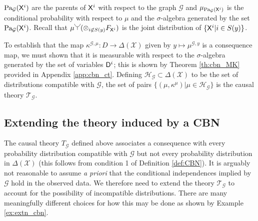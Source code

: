 $\text{Pa}_{\mathcal{G}}(\mathsf{X}^i)$ are the parents of $\mathsf{X}^i$ with respect to the graph $\mathcal{G}$ and $\mu_{\text{Pa}_{\mathcal{G}}(\mathsf{X}^i)}$ is the conditional probability with respect to $\mu$ and the $\sigma$-algebra generated by the set $\text{Pa}_{\mathcal{G}}(\mathsf{X}^i)$. Recall that $\mu \splitter{0.15}(\otimes_{i\not\in S(y)} F_{\RV{X}^i})$ is the joint distribution of $\{\mathsf{X}^i|i\in S(y)\}$.

To establish that the map $\kappa^{\mathcal{G},\mu}:D\to \Delta(\mathcal{X})$ given by $y\mapsto \mu^{\mathcal{G},y}$ is a consequence map, we must shown that it is measurable with respect to the $\sigma$-algebra generated by the set of variables $\mathsf{D}^i$; this is shown by Theorem \ref{th:cbn_MK} provided in Appendix \ref{app:cbn_ct}. Defining $\mathscr{H}_{\mathcal{G}}\subset\Delta(\mathcal{X})$ to be the set of distributions compatible with $\mathcal{G}$, the set of pairs $\{(\mu, \kappa^\mu)|\mu\in \mathscr{H}_{\mathcal{G}}\}$ is the causal theory $\mathscr{T}_\mathcal{G}$.

\subsection{Extending the theory induced by a CBN}

The causal theory $T_{\mathcal{G}}$ defined above associates a consequence with every probability distribution compatible with $\mathcal{G}$ but not every probability distribution in $\Delta(\mathcal{X})$ (this follows from condition 1 of Definition \ref{def:CBN}). It is arguably not reasonable to assume \emph{a priori} that the conditional independences implied by $\mathcal{G}$ hold in the observed data. We therefore need to extend the theory $\mathscr{T}_{\mathcal{G}}$ to account for the possibility of incompatible distributions. There are many meaningfully different choices for how this may be done as shown by Example \ref{ex:extn_cbn}.

